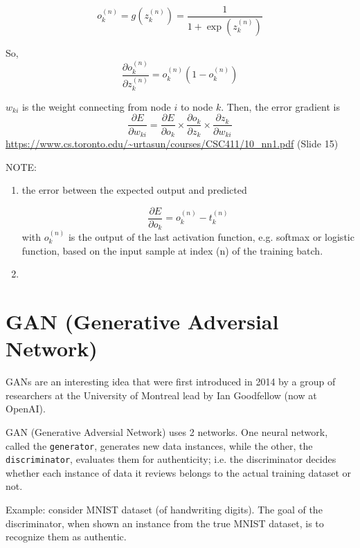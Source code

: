\begin{equation}
o_k^{(n)} = g(z_k^{(n)}) = \frac{1}{1 + \exp(z_k^{(n)})}
\end{equation}

So,
\begin{equation}
\frac{\partial o_k^{(n)}}{\partial z_k^{(n)}} = o_k^{(n)} \left( 1 - o_k^{(n)} \right)
\end{equation}

$w_{ki}$ is the weight connecting from node $i$ to node $k$. Then, the error gradient is
\begin{equation}
\frac{\partial E}{\partial w_{ki}} = \frac{\partial E}{\partial o_{k}} \times \frac{\partial o_k}{\partial z_{k}} \times \frac{\partial z_k}{\partial w_{ki}}
\end{equation}
\url{https://www.cs.toronto.edu/~urtasun/courses/CSC411/10_nn1.pdf} (Slide 15)

NOTE:
\begin{enumerate}
  \item the error between the expected output and predicted
  
\begin{equation}
\frac{\partial E}{\partial o_{k}} = o_k^{(n)} - t_k^{(n)}
\end{equation}
with $o_k^{(n)}$ is the output of the last activation function, e.g. softmax or logistic function, based on the input sample at index (n)
of the training batch.

  \item 
\end{enumerate}



\section{GAN (Generative Adversial Network)}
\label{sec:GAN}

GANs are an interesting idea that were first introduced in 2014 by a group of
researchers at the University of Montreal lead by Ian Goodfellow (now at OpenAI).

GAN (Generative Adversial Network) uses 2 networks.
One neural network, called the \verb!generator!, generates new data instances,
while the other, the \verb!discriminator!, evaluates them for authenticity; i.e.
the discriminator decides whether each instance of data it reviews belongs to the
actual training dataset or not.


Example: consider MNIST dataset (of handwriting digits).
The goal of the discriminator, when shown an instance from the true MNIST
dataset, is to recognize them as authentic.

